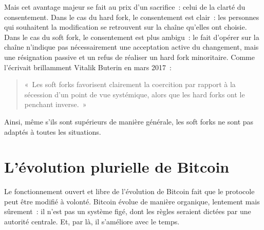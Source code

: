 
Mais cet avantage majeur se fait au prix d'un sacrifice~: celui de la clarté du consentement. Dans le cas du hard fork, le consentement est clair~: les personnes qui souhaitent la modification se retrouvent sur la chaîne qu'elles ont choisie. Dans le cas du soft fork, le consentement est plus ambigu~: le fait d'opérer sur la chaîne n'indique pas nécessairement une acceptation active du changement, mais une résignation passive et un refus de réaliser un hard fork minoritaire. Comme l'écrivait brillamment Vitalik Buterin en mars 2017~:

\begin{quote}
«~Les soft forks favorisent clairement la coercition par rapport à la sécession d'un point de vue systémique, alors que les hard forks ont le penchant inverse.~»
\end{quote} %

Ainsi, même s'ils sont supérieurs de manière générale, les soft forks ne sont pas adaptés à toutes les situations.

\section*{L'évolution plurielle de Bitcoin}

Le fonctionnement ouvert et libre de l'évolution de Bitcoin fait que le protocole peut être modifié à volonté. Bitcoin évolue de manière organique, lentement mais sûrement~: il n'est pas un système figé, dont les règles seraient dictées par une autorité centrale. Et, par là, il s'améliore avec le temps.


